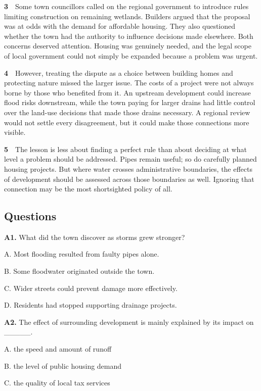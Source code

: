 \documentclass[a4paper,11pt,openany]{report}
\begin{document}
\textbf{3}　Some town councillors called on the regional government to introduce rules limiting construction on remaining wetlands. Builders argued that the proposal was at odds with the demand for affordable housing. They also questioned whether the town had the authority to influence decisions made elsewhere. Both concerns deserved attention. Housing was genuinely needed, and the legal scope of local government could not simply be expanded because a problem was urgent.

\textbf{4}　However, treating the dispute as a choice between building homes and protecting nature missed the larger issue. The costs of a project were not always borne by those who benefited from it. An upstream development could increase flood risks downstream, while the town paying for larger drains had little control over the land-use decisions that made those drains necessary. A regional review would not settle every disagreement, but it could make those connections more visible.

\textbf{5}　The lesson is less about finding a perfect rule than about deciding at what level a problem should be addressed. Pipes remain useful; so do carefully planned housing projects. But where water crosses administrative boundaries, the effects of development should be assessed across those boundaries as well. Ignoring that connection may be the most shortsighted policy of all.

\subsection{Questions}\label{questions}

\textbf{A1.} What did the town discover as storms grew stronger?

A. Most flooding resulted from faulty pipes alone.

B. Some floodwater originated outside the town.

C. Wider streets could prevent damage more effectively.

D. Residents had stopped supporting drainage projects.

\textbf{A2.} The effect of surrounding development is mainly explained by its impact on \_\_\_\_\_.

A. the speed and amount of runoff

B. the level of public housing demand

C. the quality of local tax services
\end{document}
